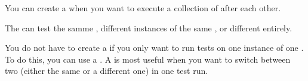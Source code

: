 
You can create a \gdjob{} when you want to execute a collection of \gdsuites{} after each other. 

The \gdsuites{} can test the samme \gdaut{}, different instances of the same \gdaut{}, or different \gdauts{} entirely. 

You do not have to create a \gdjob{} if you only want to run tests on one instance of one \gdaut{}. To do this, you can use a \gdsuite{} . A \gdjob{} is most useful when you want to switch between two \gdauts{} (either the same \gdaut{} or a different one) in one test run. 


